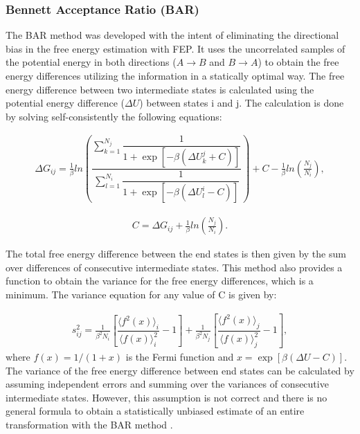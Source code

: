 \subsubsection{Bennett Acceptance Ratio (BAR)}

The BAR method \cite{bennet1976} was developed with the intent of eliminating the directional bias in the free energy estimation with FEP. It uses the uncorrelated samples of the potential energy in both directions ($A \rightarrow B$ and $B \rightarrow A$) to obtain the free energy differences utilizing the information in a statically optimal way. The free energy difference between two intermediate states is calculated using the potential energy difference ($\Delta U$) between states i and j. The calculation is done by solving self-consistently the following equations: 

\begin{equation}
\label{eq:bar1}
\begin{aligned}
\Delta G_{ij} = \frac{1}{\beta} ln \left( \dfrac{\sum_{k=1}^{N_{j}} \dfrac{1}{1+\exp[-\beta(\Delta U_{k}^{j}+C)]}}{\sum_{l=1}^{N_{i}} \dfrac{1}{1+\exp[-\beta(\Delta U_{l}^{i}-C)]}}\right) + C - \frac{1}{\beta}ln\left(\frac{N_{j}}{N_{i}}\right),
\end{aligned}
\end{equation}

\begin{equation}
\label{eq:bar2}
\begin{aligned}
C = \Delta G_{ij} + \frac{1}{\beta}ln\left(\frac{N_{j}}{N_{i}}\right).
\end{aligned}
\end{equation}

The total free energy difference between the end states is then given by the sum over differences of consecutive intermediate states. This method also provides a function to obtain the variance for the free energy differences, which is a minimum. The variance equation for any value of C is given by:

\begin{equation}
\label{eq:barvar}
\begin{aligned}
s_{ij}^{2} = \frac{1}{\beta^{2} N_{i}} \left[\dfrac{\langle{f^{2}(x)}\rangle_{i}}{\langle{f(x)}\rangle^{2}_{i}} - 1\right] + \frac{1}{\beta^{2} N_{j}} \left[\dfrac{\langle{f^{2}(x)}\rangle_{j}}{\langle{f(x)}\rangle^{2}_{j}} - 1\right],
\end{aligned}
\end{equation}
where $f(x)=1/(1+x)$ is the Fermi function and $x=\exp[\beta(\Delta U - C)]$. The variance of the free energy difference between end states can be calculated by assuming independent errors and summing over the variances of consecutive intermediate states. However, this assumption is not correct and there is no general formula to obtain a statistically unbiased estimate of an entire transformation with the BAR method \cite{bareva}. 

